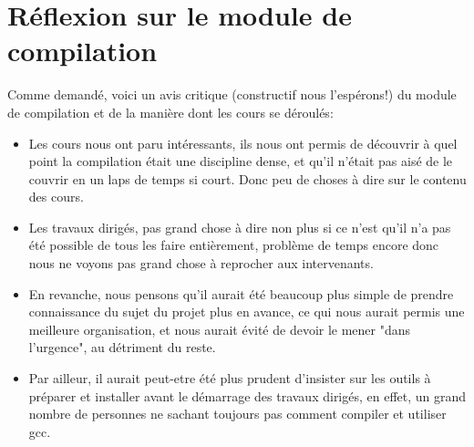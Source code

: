\section{Réflexion sur le module de compilation}

Comme demandé, voici un avis critique (constructif nous l'espérons!) du module de compilation et de la manière dont les cours se déroulés:\\

\begin{itemize}

\item Les cours nous ont paru intéressants, ils nous ont permis de découvrir à quel point la compilation était une discipline dense, et qu'il n'était pas aisé de le couvrir en un laps de temps si court. Donc peu de choses à dire sur le contenu des cours.\\

\item Les travaux dirigés, pas grand chose à dire non plus si ce n'est qu'il n'a pas été possible de tous les faire entièrement, problème de temps encore donc nous ne voyons pas grand chose à reprocher aux intervenants.\\

\item En revanche, nous pensons qu'il aurait été beaucoup plus simple de prendre connaissance du sujet du projet plus en avance, ce qui nous aurait permis une meilleure organisation, et nous aurait évité de devoir le mener "dans l'urgence", au détriment du reste.\\

\item Par ailleur, il aurait peut-etre été plus prudent d'insister sur les outils à préparer et installer avant le démarrage des travaux dirigés, en effet, un grand nombre de personnes ne sachant toujours pas comment compiler et utiliser gcc.\\

\end{itemize}
